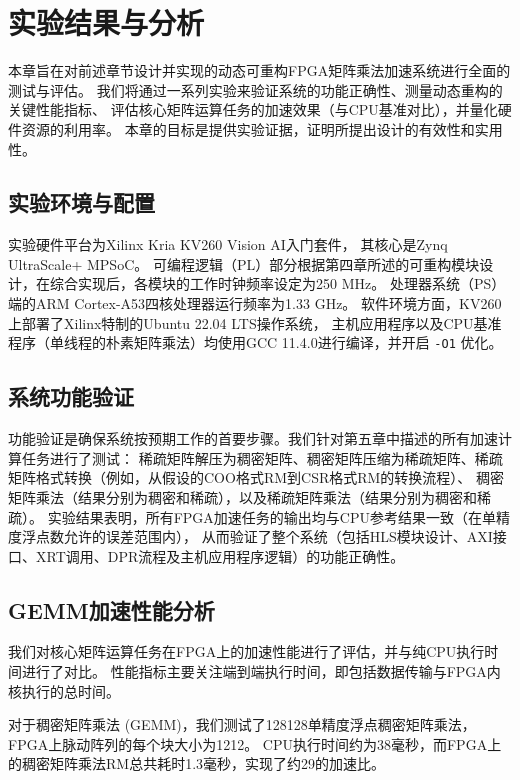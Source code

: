 \chapter{实验结果与分析}

本章旨在对前述章节设计并实现的动态可重构FPGA矩阵乘法加速系统进行全面的测试与评估。
我们将通过一系列实验来验证系统的功能正确性、测量动态重构的关键性能指标、
评估核心矩阵运算任务的加速效果（与CPU基准对比），并量化硬件资源的利用率。
本章的目标是提供实验证据，证明所提出设计的有效性和实用性。

\section{实验环境与配置}

实验硬件平台为Xilinx Kria KV260 Vision AI入门套件，
其核心是Zynq UltraScale+ MPSoC。
可编程逻辑（PL）部分根据第四章所述的可重构模块设计，在综合实现后，各模块的工作时钟频率设定为250 MHz。
处理器系统（PS）端的ARM Cortex-A53四核处理器运行频率为1.33 GHz。
软件环境方面，KV260上部署了Xilinx特制的Ubuntu 22.04 LTS操作系统，
主机应用程序以及CPU基准程序（单线程的朴素矩阵乘法）均使用GCC 11.4.0进行编译，并开启 \verb|-O1| 优化。

\section{系统功能验证}

功能验证是确保系统按预期工作的首要步骤。我们针对第五章中描述的所有加速计算任务进行了测试：
稀疏矩阵解压为稠密矩阵、稠密矩阵压缩为稀疏矩阵、稀疏矩阵格式转换（例如，从假设的COO格式RM到CSR格式RM的转换流程）、
稠密矩阵乘法（结果分别为稠密和稀疏），以及稀疏矩阵乘法（结果分别为稠密和稀疏）。
实验结果表明，所有FPGA加速任务的输出均与CPU参考结果一致（在单精度浮点数允许的误差范围内），
从而验证了整个系统（包括HLS模块设计、AXI接口、XRT调用、DPR流程及主机应用程序逻辑）的功能正确性。

\section{GEMM加速性能分析}

我们对核心矩阵运算任务在FPGA上的加速性能进行了评估，并与纯CPU执行时间进行了对比。
性能指标主要关注端到端执行时间，即包括数据传输与FPGA内核执行的总时间。

对于稠密矩阵乘法 (GEMM)，我们测试了128\texttimes{}128单精度浮点稠密矩阵乘法，FPGA上脉动阵列的每个块大小为12\texttimes{}12。
CPU执行时间约为38毫秒，而FPGA上的稠密矩阵乘法RM总共耗时1.3毫秒，实现了约29\texttimes{}的加速比。

